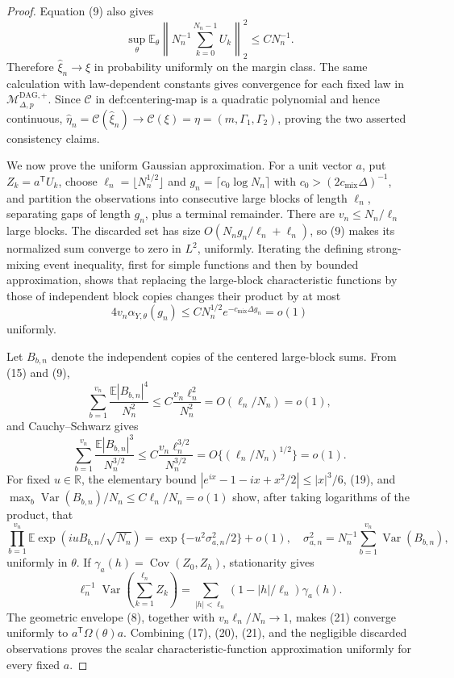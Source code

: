 \documentclass{article}
\begin{document}
\begin{proof}
Equation (9) also gives
\[
 \sup_\theta\mathbb E_\theta
 \left\lVert N_n^{-1}\sum_{k=0}^{N_n-1}U_k\right\rVert_2^2
 \leq C N_n^{-1}.
\tag{16}
\]
Therefore \(\widehat\xi_n\to\xi\) in probability uniformly on the margin class.  The same calculation with law-dependent constants gives convergence for each fixed law in \(\mathcal M_{\Delta,p}^{\mathrm{DAG},+}\).  Since \(\mathcal C\) in \(\text{def:centering-map}\) is a quadratic polynomial and hence continuous, \(\widehat\eta_n=\mathcal C(\widehat\xi_n)\to\mathcal C(\xi)=\eta=(m,\Gamma_1,\Gamma_2)\), proving the two asserted consistency claims.

We now prove the uniform Gaussian approximation.  For a unit vector \(a\), put \(Z_k=a^{\mathsf T}U_k\), choose \(\ell_n=\lfloor N_n^{1/2}\rfloor\) and \(g_n=\lceil c_0\log N_n\rceil\) with \(c_0>(2c_{\mathrm{mix}}\Delta)^{-1}\), and partition the observations into consecutive large blocks of length \(\ell_n\), separating gaps of length \(g_n\), plus a terminal remainder.  There are \(v_n\leq N_n/\ell_n\) large blocks.  The discarded set has size \(O(N_ng_n/\ell_n+\ell_n)\), so (9) makes its normalized sum converge to zero in \(L^2\), uniformly.  Iterating the defining strong-mixing event inequality, first for simple functions and then by bounded approximation, shows that replacing the large-block characteristic functions by those of independent block copies changes their product by at most
\[
 4v_n\alpha_{Y,\theta}(g_n)
 \leq C N_n^{1/2}e^{-c_{\mathrm{mix}}\Delta g_n}=o(1)
\tag{17}
\]
uniformly.

Let \(B_{b,n}\) denote the independent copies of the centered large-block sums.  From (15) and (9),
\[
 \sum_{b=1}^{v_n}\frac{\mathbb E|B_{b,n}|^4}{N_n^2}
 \leq C\frac{v_n\ell_n^2}{N_n^2}
 =O(\ell_n/N_n)=o(1),
\tag{18}
\]
and Cauchy--Schwarz gives
\[
 \sum_{b=1}^{v_n}\frac{\mathbb E|B_{b,n}|^3}{N_n^{3/2}}
 \leq C\frac{v_n\ell_n^{3/2}}{N_n^{3/2}}
 =O\{(\ell_n/N_n)^{1/2}\}=o(1).
\tag{19}
\]
For fixed \(u\in\mathbb R\), the elementary bound \(|e^{ix}-1-ix+x^2/2|\leq |x|^3/6\), (19), and \(\max_b\operatorname{Var}(B_{b,n})/N_n\leq C\ell_n/N_n=o(1)\) show, after taking logarithms of the product, that
\[
 \prod_{b=1}^{v_n}\mathbb E\exp(iuB_{b,n}/\sqrt{N_n})
 =\exp\{-u^2\sigma_{a,n}^2/2\}+o(1),
 \quad
 \sigma_{a,n}^2=N_n^{-1}\sum_{b=1}^{v_n}\operatorname{Var}(B_{b,n}),
\tag{20}
\]
uniformly in \(\theta\).  If \(\gamma_a(h)=\operatorname{Cov}(Z_0,Z_h)\), stationarity gives
\[
 \ell_n^{-1}\operatorname{Var}\left(\sum_{k=1}^{\ell_n}Z_k\right)
 =\sum_{|h|<\ell_n}(1-|h|/\ell_n)\gamma_a(h).
\tag{21}
\]
The geometric envelope (8), together with \(v_n\ell_n/N_n\to1\), makes (21) converge uniformly to \(a^{\mathsf T}\Omega(\theta)a\).  Combining (17), (20), (21), and the negligible discarded observations proves the scalar characteristic-function approximation uniformly for every fixed \(a\).


\end{proof}
\end{document}
